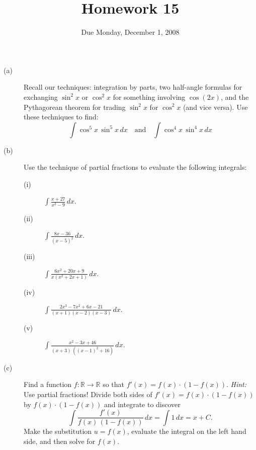 \documentclass[12pt]{article}
\title{Homework 15}
\date{Due Monday, December 1, 2008}
\newcommand{\R}{\mathbb{R}}
\begin{document}
\maketitle

\begin{description}

\item[(a)] Recall our techniques: integration by parts, two half-angle
  formulas for exchanging $\sin^2 x$ or $\cos^2 x$ for something
  involving $\cos (2x)$, and the Pythagorean theorem for trading $\sin^2 x$
  for $\cos^2 x$ (and vice versa).  Use these techniques to find:
$$
\int \cos^5 x \, \sin^5 x \, dx 
\hspace{1em}
\mbox{and}
\hspace{1em}
\int \cos^4 x \, \sin^4 x \, dx 
$$

\vfill

\item[(b)] Use the technique of partial fractions to evaluate the following integrals:
\begin{description}
\item[(i)] $\displaystyle\int \displaystyle\frac{x+27}{x^2 -9}\,dx $.

\vfill

\item[(ii)]  $\displaystyle\int \displaystyle\frac{8 x - 36}{(x-5)^2}\,dx $.

\vfill

\item[(iii)] $\displaystyle\int \displaystyle\frac{6x^2 + 20x + 9}{x (x^2 + 2x + 1)}\,dx$.

\vfill

\item[(iv)] $\displaystyle\int \displaystyle\frac{2x^3 - 7x^2 + 6x - 21}{(x+1)(x-2)(x-3)}\,dx$.

\vfill

\item[(v)] $\displaystyle\int \displaystyle\frac{x^2 - 3x + 46}{(x+3) \, \left( (x-1)^2 + 16 \right)} \, dx$.
\end{description}

\vfill

\item[(c)] Find a function $f : \R \to \R$ so that $f'(x) = f(x) \cdot
  \left( 1 - f(x) \right)$.  \textit{Hint:} Use partial fractions!
  Divide both sides of $f'(x) = f(x) \cdot
  \left( 1 - f(x) \right)$ by $f(x) \cdot \left( 1 - f(x) \right)$ and integrate to discover
$$
\int \frac{f'(x)}{f(x) \, \left( 1 - f(x) \right)} \, dx = \int 1 \, dx = x + C.
$$
Make the substitution $u = f(x)$, evaluate the integral on the left hand side, and then solve for $f(x)$.

\end{description}
\end{document}
